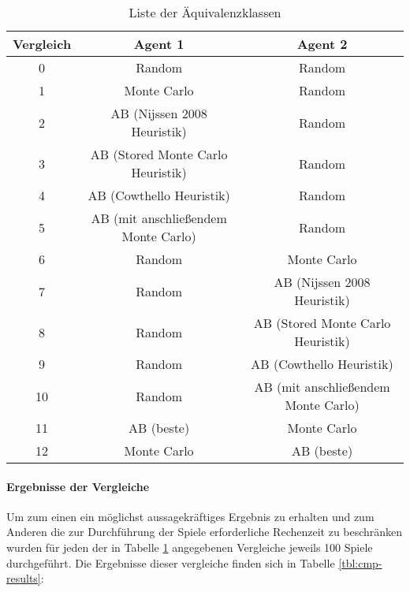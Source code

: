 \begin{table}[ht]
\begin{center}
\begin{tabular}{| c | c | c |} \hline
Vergleich & Agent 1 & Agent 2 \\ \hline
\hline
0 & Random & Random  \\ \hline
\hline
1 & Monte Carlo & Random  \\ \hline
2 & AB (Nijssen 2008 Heuristik) & Random\\ \hline
3 & AB (Stored Monte Carlo Heuristik) & Random\\ \hline
4 & AB (Cowthello Heuristik) & Random\\ \hline
5 & AB (mit anschließendem Monte Carlo) & Random\\ \hline
\hline
6 & Random & Monte Carlo\\ \hline
7 & Random & AB (Nijssen 2008 Heuristik)\\ \hline
8 & Random & AB (Stored Monte Carlo Heuristik)\\ \hline
9 & Random & AB (Cowthello Heuristik)\\ \hline
10 & Random & AB (mit anschließendem Monte Carlo)\\ \hline
\hline
11 & AB (beste) & Monte Carlo\\ \hline
12 & Monte Carlo & AB (beste)\\ \hline
\end{tabular}
\end{center}
\caption{Liste der Äquivalenzklassen}
\label{tbl:cmp-agents}
\end{table}

\paragraph{Ergebnisse der Vergleiche}
\label{p:vgl-result}
Um zum einen ein möglichst aussagekräftiges Ergebnis zu erhalten und zum Anderen die zur Durchführung der Spiele erforderliche Rechenzeit zu beschränken wurden für jeden der in Tabelle \ref{tbl:cmp-agents} angegebenen Vergleiche jeweils 100 Spiele durchgeführt. Die Ergebnisse dieser vergleiche finden sich in Tabelle \ref{tbl:cmp-results}:


